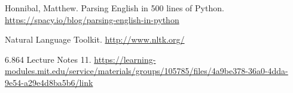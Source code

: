\begin{thebibliography}{8}
Honnibal, Matthew. Parsing English in 500 lines of Python.
\href{https://spacy.io/blog/parsing-english-in-python}{https://spacy.io/blog/parsing-english-in-python}

Natural Language Toolkit.
\href{http://www.nltk.org/}{http://www.nltk.org/}

6.864 Lecture Notes 11. 
\href{https://learning-modules.mit.edu/service/materials/groups/105785/files/4a9be378-36a0-4dda-9e54-a29e4d8ba5b6/link}{https://learning-modules.mit.edu/service/materials/groups/105785/files/4a9be378-36a0-4dda-9e54-a29e4d8ba5b6/link}

\end{thebibliography}


